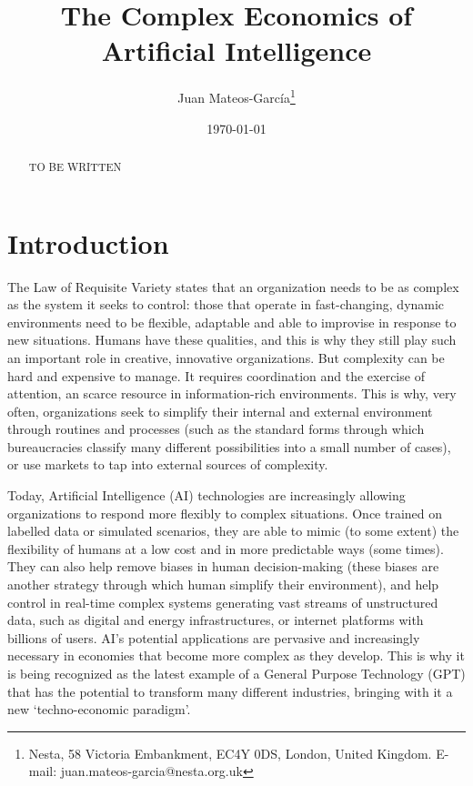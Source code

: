 \documentclass[11pt]{article}
\begin{document}
\begin{titlepage}
\title{The Complex Economics of Artificial Intelligence}
\author{Juan Mateos-Garc\'{i}a\thanks{Nesta, 58 Victoria Embankment, EC4Y 0DS, London, United Kingdom. E-mail: juan.mateos-garcia@nesta.org.uk}}
\date{\today}
\maketitle
\begin{abstract}
\noindent TO BE WRITTEN
\bigskip
\end{abstract}

\setcounter{page}{0}
\thispagestyle{empty}
\end{titlepage}

\section{Introduction}
The Law of Requisite Variety states that an organization needs to be as complex as the system it seeks to control: those that operate in fast-changing, dynamic environments need to be flexible, adaptable and able to improvise in response to new situations. Humans have these qualities, and this is why they still play such an important role in creative, innovative organizations. But complexity can be hard and expensive to manage. It requires coordination and the exercise of attention, an scarce resource in information-rich environments. This is why, very often, organizations seek to simplify their internal and external environment through routines and processes (such as the standard forms through which bureaucracies classify many different possibilities into a small number of cases), or use markets to tap into external sources of complexity. 

Today, Artificial Intelligence (AI) technologies are increasingly allowing organizations to respond more flexibly to complex situations. Once trained on labelled data or simulated scenarios, they are able to mimic (to some extent) the flexibility of humans at a low cost and in more predictable ways (some times). They can also help remove biases in human decision-making (these biases are another strategy through which human simplify their environment), and help control in real-time complex systems generating vast streams of unstructured data, such as digital and energy infrastructures, or internet platforms with billions of users. AI's potential applications are pervasive and increasingly necessary in economies that become more complex as they develop. This is why it is being recognized as the latest example of a General Purpose Technology (GPT) that has the potential to transform many different industries, bringing with it a new `techno-economic paradigm'. 
\end{document}

